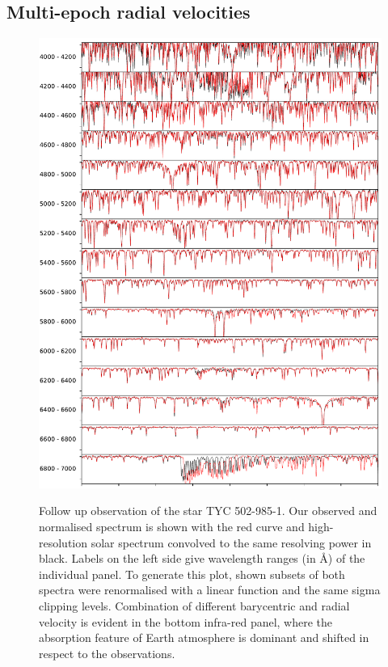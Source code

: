 \subsection{Multi-epoch radial velocities}
\label{sec:orbits_rv}

\begin{figure}
	\centering
	\includegraphics[width=\textwidth]{asiago_ref_comp.pdf}
	\label{fig:asiago_spectrum_twin}
	\caption{Follow up observation of the star TYC 502-985-1. Our observed and normalised spectrum is shown with the red curve and high-resolution solar spectrum convolved to the same resolving power in black. Labels on the left side give wavelength ranges (in \AA) of the individual panel. To generate this plot, shown subsets of both spectra were renormalised with a linear function and the same sigma clipping levels. Combination of different barycentric and radial velocity is evident in the bottom infra-red panel, where the absorption feature of Earth atmosphere is dominant and shifted in respect to the observations.}
\end{figure}

